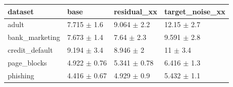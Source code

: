 \begin{tabular}{llll}
\toprule
dataset & base & residual\_xx & target\_noise\_xx \\
\midrule
adult & 7.715 $\pm$ 1.6 & 9.064 $\pm$ 2.2 & 12.15 $\pm$ 2.7 \\
bank\_marketing & 7.673 $\pm$ 1.4 & 7.64 $\pm$ 2.3 & 9.591 $\pm$ 2.8 \\
credit\_default & 9.194 $\pm$ 3.4 & 8.946 $\pm$ 2 & 11 $\pm$ 3.4 \\
page\_blocks & 4.922 $\pm$ 0.76 & 5.341 $\pm$ 0.78 & 6.416 $\pm$ 1.3 \\
phishing & 4.416 $\pm$ 0.67 & 4.929 $\pm$ 0.9 & 5.432 $\pm$ 1.1 \\
\bottomrule
\end{tabular}
